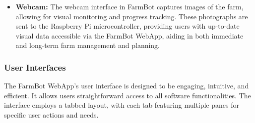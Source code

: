 \begin{itemize}
    \item \textbf{Webcam:} The webcam interface in FarmBot captures images of the farm, allowing for visual monitoring and progress tracking. These photographs are sent to the Raspberry Pi microcontroller, providing users with up-to-date visual data accessible via the FarmBot WebApp, aiding in both immediate and long-term farm management and planning.

\end{itemize}

\subsubsection{User Interfaces}
The FarmBot WebApp's user interface is designed to be engaging, intuitive, and efficient. It allows users straightforward access to all software functionalities. The interface employs a tabbed layout, with each tab featuring multiple panes for specific user actions and needs.

